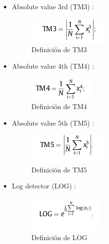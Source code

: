 \begin{itemize}
    
    
\item Absolute value 3rd (TM3) \cite{phinyomark2012feature}:
    \begin{figure}[!ht]
        \centering
        \includegraphics[scale=0.8]{imagenes/formula de caracteristicas/tm3.png}
        \caption{ Definición de TM3 \cite{phinyomark2012feature}}
        \label{fig:tm31}
    \end{figure}
    

\item Absolute value 4th (TM4) \cite{phinyomark2012feature}:
    \begin{figure}[!ht]
        \centering
        \includegraphics[scale=0.8]{imagenes/formula de caracteristicas/tm4.png}
        \caption{ Definición de TM4 \cite{phinyomark2012feature}}
        \label{fig:tm41}
    \end{figure}
\item Absolute value 5th (TM5) \cite{phinyomark2012feature}:
    \begin{figure}[!ht]
        \centering
        \includegraphics[scale=0.8]{imagenes/formula de caracteristicas/tm5.png}
        \caption{ Definición de TM5 \cite{phinyomark2012feature}}
        \label{fig:tm51}
    \end{figure}
    
\newpage
\item Log detector (LOG) \cite{phinyomark2012feature}:
    \begin{figure}[!ht]
        \centering
        \includegraphics[scale=0.8]{imagenes/formula de caracteristicas/log.png}
        \caption{ Definición de LOG \cite{phinyomark2012feature}}
        \label{fig:log1}
    \end{figure}
    

\end{itemize}
